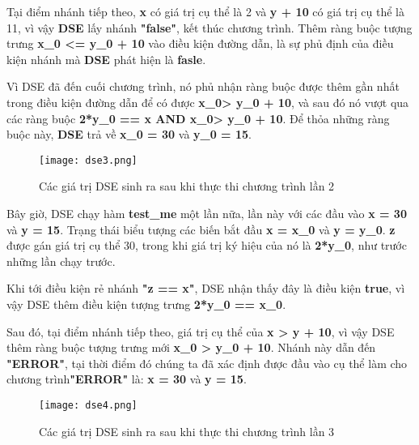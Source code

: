 Tại điểm nhánh tiếp theo, \textbf{x} có giá trị cụ thể là 2 và \textbf{y + 10} có giá trị cụ thể là 11, vì vậy \textbf{DSE} lấy nhánh \textbf{"false"}, kết thúc chương trình. Thêm ràng buộc tượng trưng \textbf{x\_0 <= y\_0 + 10} vào điều kiện đường dẫn, là sự phủ định của điều kiện nhánh mà \textbf{DSE} phát hiện là \textbf{fasle}.

Vì DSE đã đến cuối chương trình, nó phủ nhận ràng buộc được thêm gần nhất trong điều kiện đường dẫn để có được \textbf{x\_0> y\_0 + 10}, và sau đó nó vượt qua các ràng buộc \textbf{2*y\_0 == x AND x\_0> y\_0 + 10}. Để thỏa những ràng buộc này, \textbf{DSE} trả về \textbf{x\_0 = 30} và \textbf{y\_0 = 15}.

\begin{center}
	\begin{figure}[htp]
		\begin{center}
			\texttt{[image: dse3.png]}
		\end{center}
		\caption{Các giá trị DSE sinh ra sau khi thực thi chương trình lần 2}
		\label{refhinh1}
	\end{figure}
\end{center}

Bây giờ, DSE chạy hàm \textbf{test\_me} một lần nữa, lần này với các đầu vào \textbf{x = 30} và \textbf{y = 15}. Trạng thái biểu tượng các biến bắt đầu \textbf{x = x\_0} và \textbf{y = y\_0}. \textbf{z} được gán giá trị cụ thể 30, trong khi giá trị ký hiệu của nó là \textbf{2*y\_0}, như trước những lần chạy trước.

Khi tới điều kiện rẻ nhánh \textbf{"z == x"}, DSE nhận thấy đây là điều kiện \textbf{true}, vì vậy DSE thêm điều kiện tượng trưng \textbf{2*y\_0 == x\_0}.

Sau đó, tại điểm nhánh tiếp theo, giá trị cụ thể của \textbf{x > y + 10}, vì vậy DSE thêm ràng buộc tượng trưng mới \textbf{x\_0 > y\_0 + 10}. Nhánh này dẫn đến \textbf{"ERROR"}, tại thời điểm đó chúng ta đã xác định được đầu vào cụ thể làm cho chương trình\textbf{"ERROR"} là: \textbf{x = 30} và \textbf{y = 15}.

\begin{center}
	\begin{figure}[htp]
		\begin{center}
			\texttt{[image: dse4.png]}
		\end{center}
		\caption{Các giá trị DSE sinh ra sau khi thực thi chương trình lần 3}
		\label{refhinh1}
	\end{figure}
\end{center}

